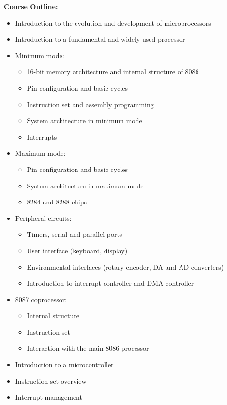 \documentclass[12pt]{article}
\begin{document}
\textbf{Course Outline:}
\begin{itemize}
    \item Introduction to the evolution and development of microprocessors
    \item Introduction to a fundamental and widely-used processor
    \item Minimum mode: 
    \begin{itemize}
        \item 16-bit memory architecture and internal structure of 8086
        \item Pin configuration and basic cycles
        \item Instruction set and assembly programming
        \item System architecture in minimum mode
        \item Interrupts
    \end{itemize}
    \item Maximum mode:
    \begin{itemize}
        \item Pin configuration and basic cycles
        \item System architecture in maximum mode
        \item 8284 and 8288 chips
    \end{itemize}
    \item Peripheral circuits:
    \begin{itemize}
        \item Timers, serial and parallel ports
        \item User interface (keyboard, display)
        \item Environmental interfaces (rotary encoder, DA and AD converters)
        \item Introduction to interrupt controller and DMA controller
    \end{itemize}
    \item 8087 coprocessor:
    \begin{itemize}
        \item Internal structure
        \item Instruction set
        \item Interaction with the main 8086 processor
    \end{itemize}
    \item Introduction to a microcontroller
    \item Instruction set overview
    \item Interrupt management

\end{itemize}
\end{document}
